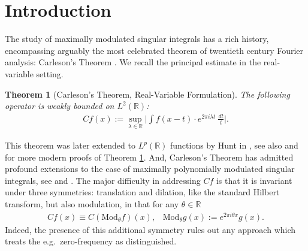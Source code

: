 \documentclass[12pt]{amsart}
\numberwithin{equation}{section}
\newtheorem{theorem}{Theorem}[section]
\theoremstyle{definition}
\begin{document}
\maketitle
 
\setcounter{footnote}{0} %
 
\pagestyle{myfancy}
 
\setcounter{tocdepth}{1}
\tableofcontents

\section{Introduction}

The study of maximally modulated singular integrals has a rich history, encompassing arguably the most celebrated theorem of twentieth century Fourier analysis: Carleson's Theorem \cite{C}. We recall the principal estimate in the real-variable setting.
\begin{theorem}[Carleson's Theorem, Real-Variable Formulation]\label{t:CL2}
    The following operator is weakly bounded on $L^2(\mathbb{R})$:
    \begin{align}\label{e:CL2}
        Cf(x):= \sup_{\lambda \in \mathbb{R}} \big| \int f(x-t) \cdot  e^{2 \pi i \lambda t} \ \frac{dt}{t}\big|.
    \end{align}
\end{theorem}
This theorem was later extended to $L^p(\mathbb{R})$ functions by Hunt in \cite{Hunt}, see also \cite{Fef} and \cite{LT} for more modern proofs of Theorem \ref{t:CL2}. And, Carleson's Theorem has admitted profound extensions to the case of maximally polynomially modulated singular integrals, see \cite{Lie} and \cite{ZK}. The major difficulty in addressing $Cf$ is that it is invariant under three symmetries: translation and dilation, like the standard Hilbert transform, but also modulation, in that for any $\theta \in \mathbb{R}$
\begin{align}
    Cf(x) \equiv C(\text{Mod}_\theta f)(x), \; \; \; \text{Mod}_\theta g(x) := e^{2 \pi i \theta x} g(x).
\end{align}
Indeed, the presence of this additional symmetry rules out any approach which treats the e.g.\ zero-frequency as distinguished.
\end{document}
